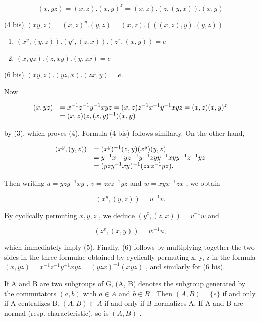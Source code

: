 \[
(x, y z) = (x, z). (x, y) ^ {z} = (x, z). (z, (y, x)). (x, y)\tag{4}
\]

(4 bis) \((xy,z) = (x,z)^y.(y,z) = (x,z).(((x,z),y).(y,z))\)

\begin{enumerate}
\def\labelenumi{(\arabic{enumi})}
\setcounter{enumi}{4}
\item
  \((x^{y}, (y, z)).(y^{z}, (z, x)).(z^{x}, (x, y)) = e\)
\item
  \((x, yz).(z, xy).(y, zx) = e\)
\end{enumerate}

(6 bis) \((xy, z). (yz, x). (zx, y) = e.\)

Now

\[
\begin{array}{r l} (x, y z) & = x ^ {- 1} z ^ {- 1} y ^ {- 1} x y z = (x, z) z ^ {- 1} x ^ {- 1} y ^ {- 1} x y z = (x, z) (x, y) ^ {z} \\ & = (x, z) (z, (x, y) ^ {- 1}) (x, y) \end{array}
\]

by (3), which proves (4). Formula (4 bis) follows similarly. On the other hand,

\[
\begin{array}{r l} (x ^ {y}, (y, z)) & = (x ^ {y}) ^ {- 1} (z, y) (x ^ {y}) (y, z) \\ & = y ^ {- 1} x ^ {- 1} y z ^ {- 1} y ^ {- 1} z y y ^ {- 1} x y y ^ {- 1} z ^ {- 1} y z \\ & = (y z y ^ {- 1} x y) ^ {- 1} (z x z ^ {- 1} y z). \end{array}
\]

Then writing \(u = yzy^{-1}xy\) , \(v = zxz^{-1}yz\) and \(w = xyx^{-1}zx\) , we obtain

\[
(x ^ {y}, (y, z)) = u ^ {- 1} v.
\]

By cyclically permuting \(x, y, z\) , we deduce \((y^z, (z, x)) = v^{-1}w\) and

\[
\left(z ^ {x}, (x, y)\right) = w ^ {- 1} u,
\]

which immediately imply (5). Finally, (6) follows by multiplying together the two sides in the three formulae obtained by cyclically permuting x, y, z in the formula \((x, yz) = x^{-1}z^{-1}y^{-1}xyz = (yzx)^{-1}(xyz)\) , and similarly for (6 bis).

If A and B are two subgroups of G, (A, B) denotes the subgroup generated by the commutators \((a, b)\) with \(a \in A\) and \(b \in B\) . Then \((A, B) = \{e\}\) if and only if A centralizes B. \((A, B) \subset A\) if and only if B normalizes A. If A and B are normal (resp. characteristic), so is \((A, B)\) .

